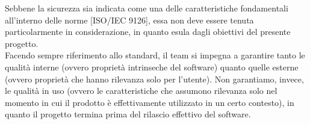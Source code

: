 		Sebbene la sicurezza sia indicata come una delle caratteristiche fondamentali all'interno delle norme [ISO/IEC 9126], essa non deve essere tenuta particolarmente in considerazione, in quanto esula dagli obiettivi del presente progetto.\\
		Facendo sempre riferimento allo standard, il team si impegna a garantire tanto le qualità interne (ovvero proprietà intrinseche del software) quanto quelle esterne (ovvero proprietà che hanno rilevanza solo per l'utente). Non garantiamo, invece, le qualità in uso (ovvero le caratteristiche che assumono rilevanza solo nel momento in cui il prodotto è effettivamente utilizzato in un certo contesto), in quanto il progetto termina prima del rilascio effettivo del software.
